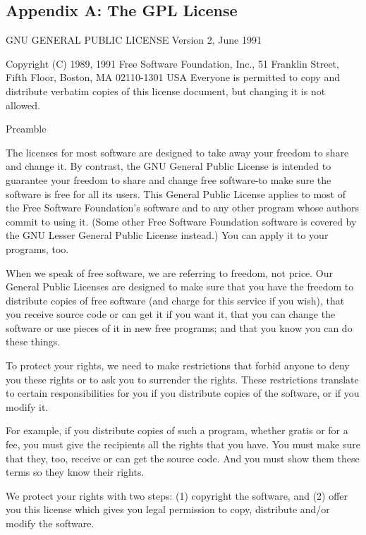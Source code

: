 \subsection*{Appendix A\-: The G\-P\-L License }

G\-N\-U G\-E\-N\-E\-R\-A\-L P\-U\-B\-L\-I\-C L\-I\-C\-E\-N\-S\-E Version 2, June 1991

Copyright (C) 1989, 1991 Free Software Foundation, Inc., 51 Franklin Street, Fifth Floor, Boston, M\-A 02110-\/1301 U\-S\-A Everyone is permitted to copy and distribute verbatim copies of this license document, but changing it is not allowed.

Preamble

The licenses for most software are designed to take away your freedom to share and change it. By contrast, the G\-N\-U General Public License is intended to guarantee your freedom to share and change free software-\/to make sure the software is free for all its users. This General Public License applies to most of the Free Software Foundation's software and to any other program whose authors commit to using it. (Some other Free Software Foundation software is covered by the G\-N\-U Lesser General Public License instead.) You can apply it to your programs, too.

When we speak of free software, we are referring to freedom, not price. Our General Public Licenses are designed to make sure that you have the freedom to distribute copies of free software (and charge for this service if you wish), that you receive source code or can get it if you want it, that you can change the software or use pieces of it in new free programs; and that you know you can do these things.

To protect your rights, we need to make restrictions that forbid anyone to deny you these rights or to ask you to surrender the rights. These restrictions translate to certain responsibilities for you if you distribute copies of the software, or if you modify it.

For example, if you distribute copies of such a program, whether gratis or for a fee, you must give the recipients all the rights that you have. You must make sure that they, too, receive or can get the source code. And you must show them these terms so they know their rights.

We protect your rights with two steps\-: (1) copyright the software, and (2) offer you this license which gives you legal permission to copy, distribute and/or modify the software.

